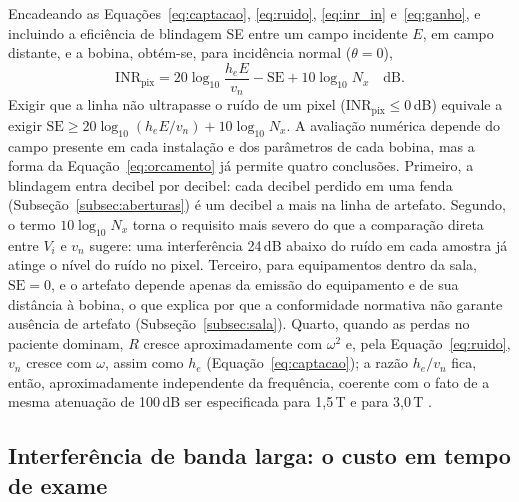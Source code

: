 \documentclass[portuguese]{sbcreviews-2025}%
\begin{document}
Encadeando as Equações~\eqref{eq:captacao}, \eqref{eq:ruido}, \eqref{eq:inr_in} e~\eqref{eq:ganho}, e incluindo a eficiência de blindagem SE entre um campo incidente $E$, em campo distante, e a bobina, obtém-se, para incidência normal ($\theta = 0$),
\begin{equation}
\mathrm{INR}_{\mathrm{pix}} = 20\log_{10}\frac{h_e E}{v_n} - \mathrm{SE} + 10\log_{10}N_x \quad \mathrm{dB}.
\label{eq:orcamento}
\end{equation}
Exigir que a linha não ultrapasse o ruído de um pixel ($\mathrm{INR}_{\mathrm{pix}} \le 0$\,dB) equivale a exigir $\mathrm{SE} \ge 20\log_{10}(h_e E/v_n) + 10\log_{10}N_x$. A avaliação numérica depende do campo presente em cada instalação e dos parâmetros de cada bobina, mas a forma da Equação~\eqref{eq:orcamento} já permite quatro conclusões. Primeiro, a blindagem entra decibel por decibel: cada decibel perdido em uma fenda (Subseção~\ref{subsec:aberturas}) é um decibel a mais na linha de artefato. Segundo, o termo $10\log_{10}N_x$ torna o requisito mais severo do que a comparação direta entre $V_i$ e $v_n$ sugere: uma interferência 24\,dB abaixo do ruído em cada amostra já atinge o nível do ruído no pixel. Terceiro, para equipamentos dentro da sala, $\mathrm{SE} = 0$, e o artefato depende apenas da emissão do equipamento e de sua distância à bobina, o que explica por que a conformidade normativa não garante ausência de artefato (Subseção~\ref{subsec:sala}). Quarto, quando as perdas no paciente dominam, $R$ cresce aproximadamente com $\omega^2$ \citep{hoult1976} e, pela Equação~\eqref{eq:ruido}, $v_n$ cresce com $\omega$, assim como $h_e$ (Equação~\eqref{eq:captacao}); a razão $h_e/v_n$ fica, então, aproximadamente independente da frequência, coerente com o fato de a mesma atenuação de 100\,dB ser especificada para 1,5\,T e para 3,0\,T \citep{kwok2024rf}.

\subsection{Interferência de banda larga: o custo em tempo de exame}
\label{subsec:banda_larga}
\end{document}
